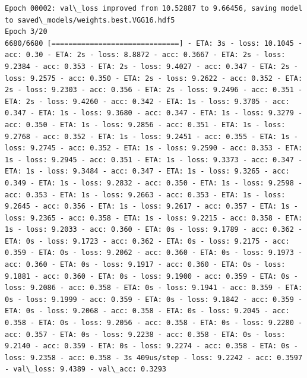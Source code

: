\documentclass[11pt]{article}
\begin{document}
\begin{Verbatim}[commandchars=\\\{\}]
Epoch 00002: val\_loss improved from 10.52887 to 9.66456, saving model to saved\_models/weights.best.VGG16.hdf5
Epoch 3/20
6680/6680 [==============================] - ETA: 3s - loss: 10.1045 - acc: 0.30 - ETA: 2s - loss: 8.8872 - acc: 0.3667 - ETA: 2s - loss: 9.2384 - acc: 0.353 - ETA: 2s - loss: 9.4027 - acc: 0.347 - ETA: 2s - loss: 9.2575 - acc: 0.350 - ETA: 2s - loss: 9.2622 - acc: 0.352 - ETA: 2s - loss: 9.2303 - acc: 0.356 - ETA: 2s - loss: 9.2496 - acc: 0.351 - ETA: 2s - loss: 9.4260 - acc: 0.342 - ETA: 1s - loss: 9.3705 - acc: 0.347 - ETA: 1s - loss: 9.3680 - acc: 0.347 - ETA: 1s - loss: 9.3279 - acc: 0.350 - ETA: 1s - loss: 9.2856 - acc: 0.351 - ETA: 1s - loss: 9.2768 - acc: 0.352 - ETA: 1s - loss: 9.2451 - acc: 0.355 - ETA: 1s - loss: 9.2745 - acc: 0.352 - ETA: 1s - loss: 9.2590 - acc: 0.353 - ETA: 1s - loss: 9.2945 - acc: 0.351 - ETA: 1s - loss: 9.3373 - acc: 0.347 - ETA: 1s - loss: 9.3484 - acc: 0.347 - ETA: 1s - loss: 9.3265 - acc: 0.349 - ETA: 1s - loss: 9.2832 - acc: 0.350 - ETA: 1s - loss: 9.2598 - acc: 0.353 - ETA: 1s - loss: 9.2663 - acc: 0.353 - ETA: 1s - loss: 9.2645 - acc: 0.356 - ETA: 1s - loss: 9.2617 - acc: 0.357 - ETA: 1s - loss: 9.2365 - acc: 0.358 - ETA: 1s - loss: 9.2215 - acc: 0.358 - ETA: 1s - loss: 9.2033 - acc: 0.360 - ETA: 0s - loss: 9.1789 - acc: 0.362 - ETA: 0s - loss: 9.1723 - acc: 0.362 - ETA: 0s - loss: 9.2175 - acc: 0.359 - ETA: 0s - loss: 9.2062 - acc: 0.360 - ETA: 0s - loss: 9.1973 - acc: 0.360 - ETA: 0s - loss: 9.1917 - acc: 0.360 - ETA: 0s - loss: 9.1881 - acc: 0.360 - ETA: 0s - loss: 9.1900 - acc: 0.359 - ETA: 0s - loss: 9.2086 - acc: 0.358 - ETA: 0s - loss: 9.1941 - acc: 0.359 - ETA: 0s - loss: 9.1999 - acc: 0.359 - ETA: 0s - loss: 9.1842 - acc: 0.359 - ETA: 0s - loss: 9.2068 - acc: 0.358 - ETA: 0s - loss: 9.2045 - acc: 0.358 - ETA: 0s - loss: 9.2056 - acc: 0.358 - ETA: 0s - loss: 9.2280 - acc: 0.357 - ETA: 0s - loss: 9.2238 - acc: 0.358 - ETA: 0s - loss: 9.2140 - acc: 0.359 - ETA: 0s - loss: 9.2274 - acc: 0.358 - ETA: 0s - loss: 9.2358 - acc: 0.358 - 3s 409us/step - loss: 9.2242 - acc: 0.3597 - val\_loss: 9.4389 - val\_acc: 0.3293


\end{Verbatim}
\end{document}
